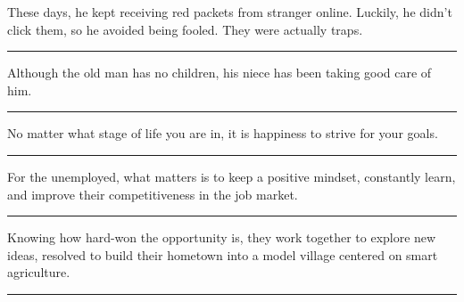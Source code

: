\documentclass[11pt,a4paper]{article}
\newcommand{\num}[1]{\makebox[1.9em][r]{#1.}\hspace{0.3em}}
\newcommand{\wline}{\noindent\rule{\linewidth}{0.4pt}}
\begin{document}
\begin{minipage}{\linewidth}

\num{24}These days, he kept receiving red packets from stranger online. Luckily, he didn’t click them, so he avoided being fooled. They were actually traps.

\vspace{0.25em}

\wline

\end{minipage}

\vspace{0.35em}\vspace{0.15em}

\begin{minipage}{\linewidth}

\num{25}Although the old man has no children, his niece has been taking good care of him.

\vspace{0.25em}

\wline

\end{minipage}

\begin{minipage}{\linewidth}

\num{26}No matter what stage of life you are in, it is happiness to strive for your goals.

\vspace{0.25em}

\wline

\end{minipage}

\begin{minipage}{\linewidth}

\num{27}For the unemployed, what matters is to keep a positive mindset, constantly learn, and improve their competitiveness in the job market.

\vspace{0.25em}

\wline

\end{minipage}

\begin{minipage}{\linewidth}

\num{28}Knowing how hard-won the opportunity is, they work together to explore new ideas, resolved to build their hometown into a model village centered on smart agriculture.

\vspace{0.25em}

\wline

\end{minipage}
\end{document}
